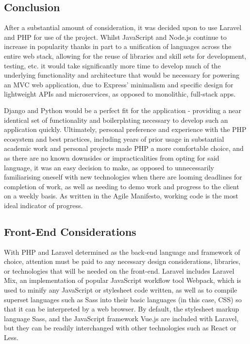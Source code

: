 \subsection{Conclusion}
After a substantial amount of consideration, it was decided upon to use Laravel and PHP for use of the project. Whilst JavaScript and Node.js continue to increase in popularity thanks in part to a unification of languages across the entire web stack, allowing for the reuse of libraries and skill sets for development, testing, etc. it would take significantly more time to develop much of the underlying functionality and architecture that would be necessary for powering an MVC web application, due to Express' minimalism and specific design for lightweight APIs and microservices, as opposed to monolithic, full-stack apps. %

Django and Python would be a perfect fit for the application - providing a near identical set of functionality and boilerplating necessary to develop such an application quickly. Ultimately, personal preference and experience with the PHP ecosystem and best practices, including years of prior usage in substantial academic work and personal projects made PHP a more comfortable choice, and as there are no known downsides or impracticalities from opting for said language, it was an easy decision to make, as opposed to unnecessarily familiarising oneself with new technologies when there are looming deadlines for completion of work, as well as needing to demo work and progress to the client on a weekly basis. As written in the Agile Manifesto, working code is the most ideal indicator of progress. %

\subsection{Front-End Considerations}
With PHP and Laravel determined as the back-end language and framework of choice, attention must be paid to any necessary design considerations, libraries, or technologies that will be needed on the front-end. Laravel includes Laravel Mix, an implementation of popular JavaScript workflow tool Webpack, which is used to minify any JavaScript or stylesheet code written, as well as to compile superset languages such as Sass into their basic languages (in this case, CSS) so that it can be interpreted by a web browser. By default, the stylesheet markup language Sass, and the JavaScript framework Vue.js are included with Laravel, but they can be readily interchanged with other technologies such as React or Less.

